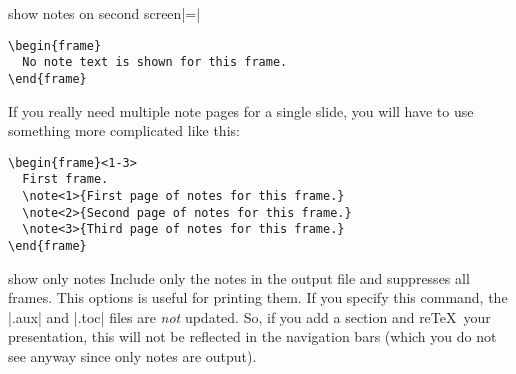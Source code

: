 \begin{beameroption}{show notes on second screen}{|=|}
\begin{verbatim}
\begin{frame}
  No note text is shown for this frame.
\end{frame}
\end{verbatim}

  If you really need multiple note pages for a single slide, you will have to use something more complicated like this:
\begin{verbatim}
\begin{frame}<1-3>
  First frame.
  \note<1>{First page of notes for this frame.}
  \note<2>{Second page of notes for this frame.}
  \note<3>{Third page of notes for this frame.}
\end{frame}
\end{verbatim}
\end{beameroption}


\begin{beameroption}{show only notes}{}
  Include only the notes in the output file and suppresses all frames. This options is useful for printing them. If you specify this command, the |.aux| and |.toc| files are \emph{not} updated. So, if you add a section and re\TeX\ your presentation, this will not be reflected in the navigation bars (which you do not see anyway since only notes are output).
\end{beameroption}
